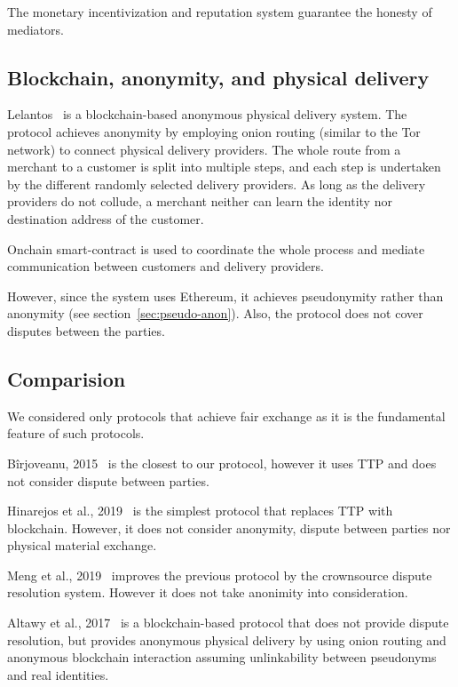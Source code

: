 \documentclass{ieeeaccess}
\begin{document}
The monetary incentivization and reputation system guarantee the honesty of mediators.

\subsection{Blockchain, anonymity, and physical delivery}\label{lelantos-a-blockchain-based-anonymous-physical-delivery-system}

Lelantos~\cite{altawyLelantosBlockchainBasedAnonymous2017} is a blockchain-based anonymous
physical delivery system. The protocol achieves anonymity by employing onion routing (similar to the Tor network) to connect physical delivery providers. The whole route from a merchant to a customer is split into multiple steps, and each step is undertaken by the different randomly selected delivery providers. As long as the delivery providers do not collude, a merchant neither can learn the identity nor destination address of the customer.

Onchain smart-contract is used to coordinate the whole process and
mediate communication between customers and delivery providers.

However, since the system uses Ethereum, it achieves pseudonymity rather than anonymity (see section~\ref{sec:pseudo-anon}). Also, the protocol does not cover disputes between the parties.

\subsection{Comparision}

We considered only protocols that achieve fair exchange as it is the fundamental feature of such protocols.

Bîrjoveanu, 2015~\cite{birjoveanuAnonymityFairexchangeEcommerce2015} is the closest to our protocol, however it uses TTP and does not consider dispute between parties.

Hinarejos et al., 2019~\cite{hinarejosSolutionSecureCertified2019} is the simplest protocol that replaces TTP with blockchain. However, it does not consider anonymity, dispute between parties nor physical material exchange.

Meng et al., 2019~\cite{mengThemisDecentralizedEscrow2019} improves the previous protocol by the crownsource dispute resolution system. However it does not take anonimity into consideration.

Altawy et al., 2017~\cite{altawyLelantosBlockchainBasedAnonymous2017} is a blockchain-based protocol that does not provide dispute resolution, but provides anonymous physical delivery by using onion routing and anonymous blockchain interaction assuming unlinkability between pseudonyms and real identities.
\end{document}
